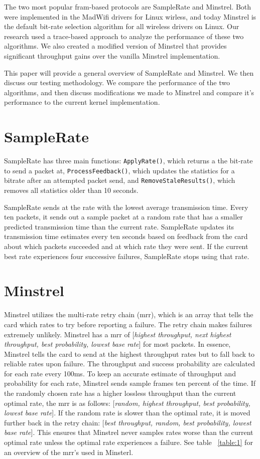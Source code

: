 \documentclass[letterpaper,twocolumn,10pt]{article}
\begin{document}
The two most popular fram-based protocols are SampleRate and Minstrel. Both were implemented in the MadWifi drivers for Linux wirless, and today Minstrel is the default bit-rate selection algorithm for all wireless drivers on Linux. Our research used a trace-based approach to analyze the performance of these two algorithms. We also created a modified version of Minstrel that provides significant throughput gains over the vanilla Minstrel implementation. 

This paper will provide a general overview of SampleRate and Minstrel. We then discuss our testing methodology. We compare the performance of the two algorithms, and then discuss modifications we made to Minstrel and compare it's performance to the current kernel implementation.
\section{SampleRate}

SampleRate has three main functions: \texttt{ApplyRate()}, which returns a the bit-rate to send a packet at, \texttt{ProcessFeedback()}, which updates the statistics for a bitrate after an attempted packet send,  and \texttt{RemoveStaleResults()}, which removes all statistics older than 10 seconds.

SampleRate sends at the rate with the lowest average transmission time. Every ten packets, it sends out a sample packet at a random rate that has a smaller predicted transmission time than the current rate. SampleRate updates its transmission time estimates every ten seconds based on feedback from the card about which packets succeeded and at which rate they were sent. If the current best rate experiences four successive failures, SampleRate stops using that rate. 

\section{Minstrel}

Minstrel utilizes the multi-rate retry chain (mrr), which is an array that tells the card which rates to try before reporting a failure. The retry chain makes failures extremely unlikely. Minstrel has a mrr of [\emph{highest throughput, next highest throughput, best probability, lowest base rate}] for most packets. In essence, Minstrel tells the card to send at the highest throughput rates but to fall back to reliable rates upon failure. The throughput and success probability are calculated for each rate every 100ms. 
To keep an accurate estimate of throughput and probability for each rate, Minstrel sends sample frames ten percent of the time. If the randomly chosen rate has a higher lossless throughput than the current optimal rate, the mrr is as follows: [\emph{random, highest throughput, best probability, lowest base rate}]. If the random rate is slower than the optimal rate, it is moved further back in the retry chain: [\emph{best throughput, random, best probability, lowest base rate}]. This ensures that Minstrel never samples rates worse than the current optimal rate unless the optimal rate experiences a failure. See table ~\ref{table:1} for an overview of the mrr's used in Minsterl.
\end{document}
